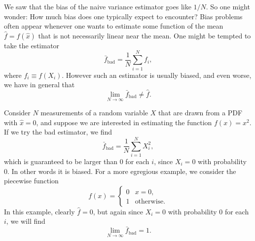 \vspace{1cm}
We saw that the bias of the naive variance estimator goes like $1/N$. 
So one might wonder: How much bias does one typically expect to encounter? 
Bias problems often appear whenever one wants to estimate some function 
of the mean $\hat{f}=f(\hat{x})$ that is not necessarily linear near the 
mean. One might be tempted to take the estimator
\begin{equation}
  \bar{f}_{\text{bad}}=\frac{1}{N}\sum_{i=1}^Nf_i,
\end{equation}
where $f_i\equiv f(X_i)$. However such an estimator is usually biased,
and even worse, we have in general that
\begin{equation}
  \lim_{N\to\infty}\bar{f}_\text{bad}\neq\hat{f}.
\end{equation}

\begin{example}{}{} Consider $N$ measurements of a random variable $X$ that
are drawn from a PDF with  $\hat{x}=0$, and suppose we are interested 
in estimating the function $f(x)=x^2$. If we try the bad estimator, we find
\begin{equation}
  \bar{f}_\text{bad}=\frac{1}{N}\sum_{i=1}^N X_i^2,
\end{equation}
which is guaranteed to be larger than 0 for each $i$, since $X_i=0$
with probability 0. In other words it is biased. For a more egregious example, 
we consider the piecewise function
\begin{equation*}
  f(x)=
  \begin{cases}
  0 & x=0, \\
  1 & \text{otherwise}.
  \end{cases}
\end{equation*}
In this example, clearly $\hat{f}=0$, but again since $X_i=0$ with probability
0 for each $i$, we will find
\begin{equation*}
  \lim_{N\to\infty}\bar{f}_\text{bad}=1.
\end{equation*}
\end{example}

